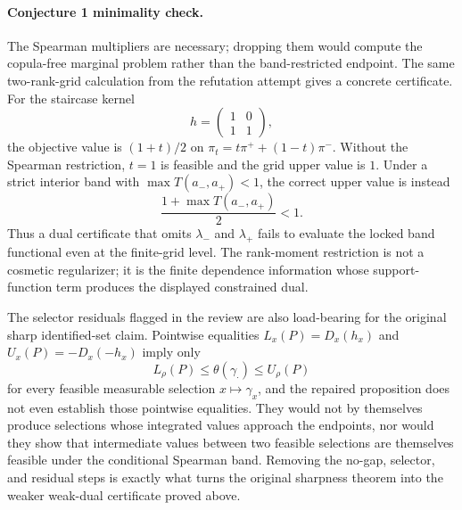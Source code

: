 \documentclass[11pt]{article}
\theoremstyle{definition}
\theoremstyle{plain}
\theoremstyle{remark}
\begin{document}
\paragraph{Conjecture 1 minimality check.}
The Spearman multipliers are necessary; dropping them would compute the copula-free marginal problem rather than the band-restricted endpoint.  The same two-rank-grid calculation from the refutation attempt gives a concrete certificate.  For the staircase kernel
\[
h=\begin{pmatrix}1&0\\1&1\end{pmatrix},
\]
the objective value is \((1+t)/2\) on \(\pi_t=t\pi^+ +(1-t)\pi^-\).  Without the Spearman restriction, \(t=1\) is feasible and the grid upper value is \(1\).  Under a strict interior band with \(\max T(a_-,a_+)<1\), the correct upper value is instead
\[
\frac{1+\max T(a_-,a_+)}{2}<1.
\]
Thus a dual certificate that omits \(\lambda_-\) and \(\lambda_+\) fails to evaluate the locked band functional even at the finite-grid level.  The rank-moment restriction is not a cosmetic regularizer; it is the finite dependence information whose support-function term produces the displayed constrained dual.

The selector residuals flagged in the review are also load-bearing for the original sharp identified-set claim.  Pointwise equalities \(L_x(P)=D_x(h_x)\) and \(U_x(P)=-D_x(-h_x)\) imply only
\[
L_\rho(P)\le \theta(\gamma_\cdot)\le U_\rho(P)
\]
for every feasible measurable selection \(x\mapsto\gamma_x\), and the repaired proposition does not even establish those pointwise equalities.  They would not by themselves produce selections whose integrated values approach the endpoints, nor would they show that intermediate values between two feasible selections are themselves feasible under the conditional Spearman band.  Removing the no-gap, selector, and residual steps is exactly what turns the original sharpness theorem into the weaker weak-dual certificate proved above.
\end{document}
